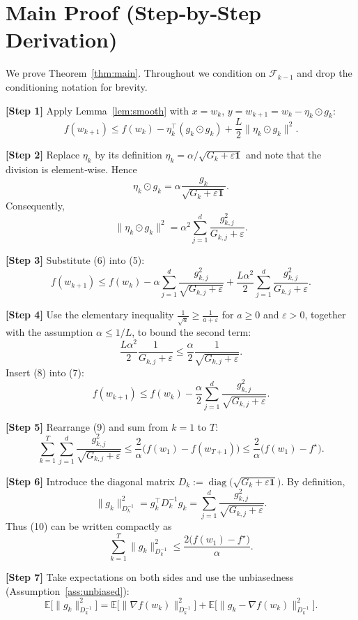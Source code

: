 \documentclass{article}
\newcommand{\E}{\mathbb{E}}
\begin{document}
\section*{Main Proof (Step‑by‑Step Derivation)}
We prove Theorem~\ref{thm:main}. Throughout we condition on $\mathcal{F}_{k-1}$ and drop the conditioning notation for brevity.

\noindent\textbf{[Step 1]} Apply Lemma~\ref{lem:smooth} with $x=w_k$, $y=w_{k+1}=w_k-\eta_k\odot g_k$:
\[
f(w_{k+1}) \le f(w_k)-\eta_k^{\top}(g_k\odot g_k)+\frac{L}{2}\|\eta_k\odot g_k\|^{2}.
\tag{5}
\]

\noindent\textbf{[Step 2]} Replace $\eta_k$ by its definition $\eta_k=\alpha\big/ \sqrt{G_k+\varepsilon\mathbf 1}$ and note that the division is element‑wise. Hence
\[
\eta_k\odot g_k = \alpha\frac{g_k}{\sqrt{G_k+\varepsilon\mathbf 1}}.
\]
Consequently,
\[
\|\eta_k\odot g_k\|^{2}= \alpha^{2}\sum_{j=1}^{d}\frac{g_{k,j}^{2}}{G_{k,j}+\varepsilon}.
\tag{6}
\]

\noindent\textbf{[Step 3]} Substitute (6) into (5):
\[
f(w_{k+1}) \le f(w_k)-\alpha\sum_{j=1}^{d}\frac{g_{k,j}^{2}}{\sqrt{G_{k,j}+\varepsilon}}
+\frac{L\alpha^{2}}{2}\sum_{j=1}^{d}\frac{g_{k,j}^{2}}{G_{k,j}+\varepsilon}.
\tag{7}
\]

\noindent\textbf{[Step 4]} Use the elementary inequality $\frac{1}{\sqrt{a}}\ge\frac{1}{a+\varepsilon}$ for $a\ge0$ and $\varepsilon>0$, together with the assumption $\alpha\le 1/L$, to bound the second term:
\[
\frac{L\alpha^{2}}{2}\frac{1}{G_{k,j}+\varepsilon}
\le \frac{\alpha}{2}\frac{1}{\sqrt{G_{k,j}+\varepsilon}}.
\tag{8}
\]
Insert (8) into (7):
\[
f(w_{k+1}) \le f(w_k)-\frac{\alpha}{2}\sum_{j=1}^{d}\frac{g_{k,j}^{2}}{\sqrt{G_{k,j}+\varepsilon}}.
\tag{9}
\]

\noindent\textbf{[Step 5]} Rearrange (9) and sum from $k=1$ to $T$:
\[
\sum_{k=1}^{T}\sum_{j=1}^{d}\frac{g_{k,j}^{2}}{\sqrt{G_{k,j}+\varepsilon}}
\le \frac{2}{\alpha}\bigl(f(w_1)-f(w_{T+1})\bigr)
\le \frac{2}{\alpha}\bigl(f(w_1)-f^{\star}\bigr).
\tag{10}
\]

\noindent\textbf{[Step 6]} Introduce the diagonal matrix $D_k:=\operatorname{diag}\bigl(\sqrt{G_k+\varepsilon\mathbf 1}\bigr)$. By definition,
\[
\|g_k\|_{D_k^{-1}}^{2}=g_k^{\top}D_k^{-1}g_k
= \sum_{j=1}^{d}\frac{g_{k,j}^{2}}{\sqrt{G_{k,j}+\varepsilon}}.
\tag{11}
\]
Thus (10) can be written compactly as
\[
\sum_{k=1}^{T}\|g_k\|_{D_k^{-1}}^{2}\le \frac{2\bigl(f(w_1)-f^{\star}\bigr)}{\alpha}.
\tag{12}
\]

\noindent\textbf{[Step 7]} Take expectations on both sides and use the unbiasedness (Assumption~\ref{ass:unbiased}):
\[
\E\!\bigl[\|g_k\|_{D_k^{-1}}^{2}\bigr]
= \E\!\bigl[\|\nabla f(w_k)\|_{D_k^{-1}}^{2}\bigr]
+ \E\!\bigl[\|g_k-\nabla f(w_k)\|_{D_k^{-1}}^{2}\bigr].
\tag{13}
\]
\end{document}
